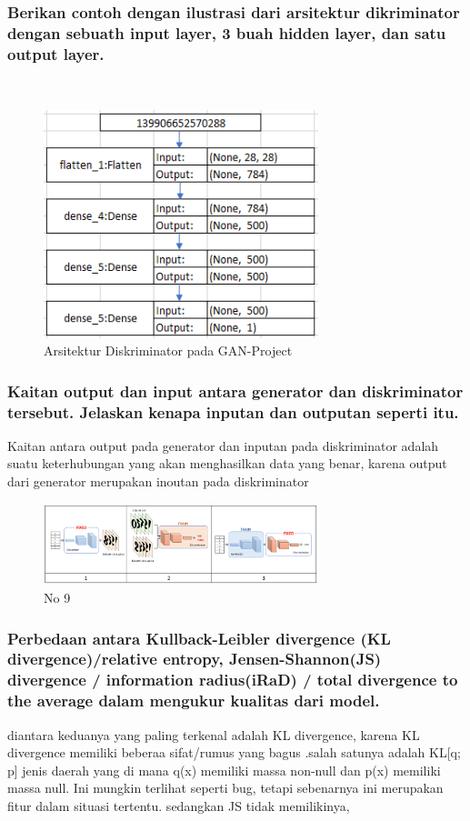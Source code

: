 \subsubsection{Berikan contoh dengan ilustrasi dari arsitektur dikriminator dengan sebuath input layer, 3 buah hidden layer, dan satu output layer.}
\hfill\\
\begin{figure}[H]
	\centering
	\includegraphics[width=8cm]{figures/1174087/8/4a.png}
	\caption{Arsitektur Diskriminator pada GAN-Project}
\end{figure}



\subsubsection{Kaitan output dan input antara generator dan diskriminator tersebut. Jelaskan kenapa inputan dan outputan seperti itu.}
\hfill\break
Kaitan antara output pada generator dan inputan pada diskriminator adalah suatu keterhubungan yang akan menghasilkan data yang benar, karena output dari generator merupakan inoutan pada diskriminator
\begin{figure}[H]
	\centering
	\includegraphics[width=8cm]{figures/1174087/8/9.png}
	\caption{No 9}
\end{figure}

\subsubsection{Perbedaan antara Kullback-Leibler divergence (KL divergence)/relative entropy, Jensen-Shannon(JS) divergence / information radius(iRaD) / total divergence to the average dalam mengukur kualitas dari model.}
\hfill\break
diantara keduanya yang paling terkenal adalah KL divergence, karena KL divergence memiliki beberaa sifat/rumus yang bagus .salah satunya adalah KL[q; p] jenis daerah yang di mana q(x) memiliki massa non-null dan p(x) memiliki massa null. Ini mungkin terlihat seperti bug, tetapi sebenarnya ini merupakan fitur dalam situasi tertentu. sedangkan JS tidak memilikinya,

